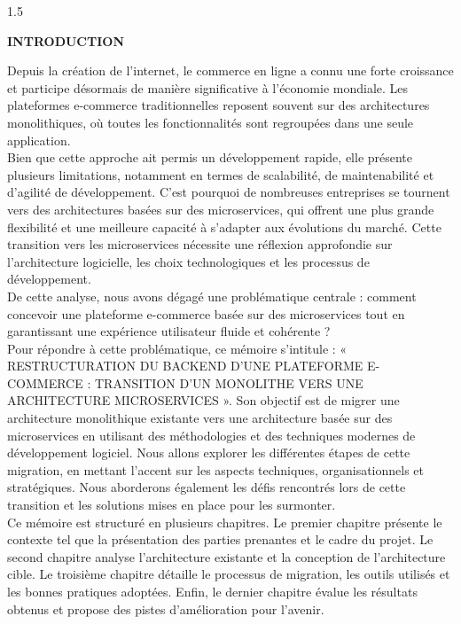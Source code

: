     \begin{spacing}{1.5}
        
        \begin{center}
            {\large\bfseries INTRODUCTION}
        \end{center}
        Depuis la création de l'internet, le commerce en ligne a connu une forte croissance et participe désormais 
        de manière significative à l'économie mondiale. 
        Les plateformes e-commerce traditionnelles reposent souvent sur des architectures monolithiques, 
        où toutes les fonctionnalités sont regroupées dans une seule application.\\
        Bien que cette approche ait permis un développement rapide, elle présente plusieurs limitations, 
        notamment en termes de scalabilité, de maintenabilité et d'agilité de développement.
        C'est pourquoi de nombreuses entreprises se tournent vers des architectures basées sur des microservices, 
        qui offrent une plus grande flexibilité et une meilleure capacité à s'adapter aux évolutions du marché.
        Cette transition vers les microservices nécessite une réflexion approfondie sur l'architecture logicielle, 
        les choix technologiques et les processus de développement.\\
        De cette analyse, nous avons dégagé une problématique centrale : comment concevoir une plateforme e-commerce
        basée sur des microservices tout en garantissant une expérience utilisateur fluide et cohérente ? \\
        Pour répondre à cette problématique, ce mémoire s'intitule : « RESTRUCTURATION DU BACKEND D'UNE PLATEFORME E-COMMERCE : TRANSITION D'UN MONOLITHE VERS UNE ARCHITECTURE MICROSERVICES ». Son objectif est de migrer une architecture monolithique existante vers une architecture basée sur des microservices en utilisant des méthodologies et des techniques modernes de développement logiciel.
        Nous allons explorer les différentes étapes de cette migration,
        en mettant l'accent sur les aspects techniques, organisationnels et stratégiques.
        Nous aborderons également les défis rencontrés lors de cette transition et les solutions mises en place pour les surmonter.\\
        Ce mémoire est structuré en plusieurs chapitres.
        Le premier chapitre présente le contexte tel que la présentation des parties prenantes et le cadre du projet.
        Le second chapitre analyse l'architecture existante et la conception de l'architecture cible.
        Le troisième chapitre détaille le processus de migration, les outils utilisés et les bonnes pratiques adoptées.
        Enfin, le dernier chapitre évalue les résultats obtenus et propose des pistes d'amélioration pour l'avenir.
    \end{spacing}
